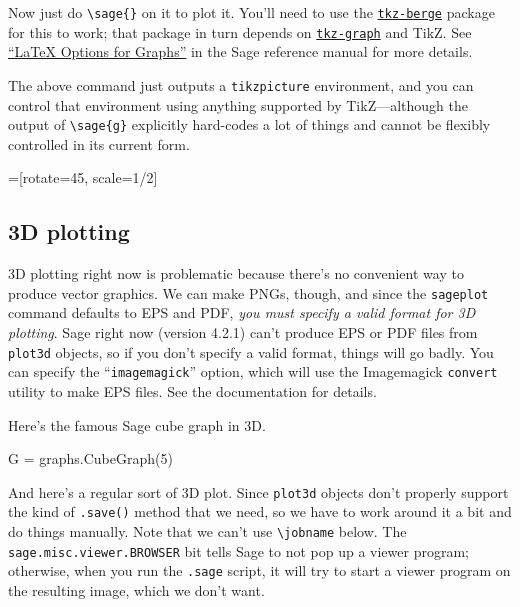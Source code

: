 \documentclass{article}
\begin{document}
Now just do \verb|\sage{}| on it to plot it. You'll need to use the
\href{http://altermundus.com/pages/graphtheory.html}{\texttt{tkz-berge}}
package for this to work; that package in turn depends on
\href{http://altermundus.com/pages/graph.html}{\texttt{tkz-graph}} and
TikZ. See
\href{http://sagemath.org/doc/reference/sage/graphs/graph_latex.html}{``\LaTeX{}
  Options for Graphs''} in the Sage reference manual for more details.

\begin{center}
\end{center}

The above command just outputs a \texttt{tikzpicture} environment, and
you can control that environment using anything supported by
TikZ---although the output of \verb|\sage{g}| explicitly hard-codes a
lot of things and cannot be flexibly controlled in its current form.

=[rotate=45, scale=1/2]

\begin{center}
\end{center}


\subsection{3D plotting}

3D plotting right now is problematic because there's no convenient way
to produce vector graphics. We can make PNGs, though, and since the
\verb|sageplot| command defaults to EPS and PDF, \emph{you must specify
  a valid format for 3D plotting}. Sage right now (version 4.2.1) can't
produce EPS or PDF files from \texttt{plot3d} objects, so if you don't
specify a valid format, things will go badly. You can specify the
``\texttt{imagemagick}'' option, which will use the Imagemagick
\texttt{convert} utility to make EPS files. See the documentation for
details.

Here's the famous Sage cube graph in 3D.

\begin{sageblock}
G = graphs.CubeGraph(5)
\end{sageblock}


And here's a regular sort of 3D plot. Since \texttt{plot3d} objects
don't properly support the kind of \texttt{.save()} method that we need,
so we have to work around it a bit and do things manually. Note that we
can't use \verb|\jobname| below. The \texttt{sage.misc.viewer.BROWSER}
bit tells Sage to not pop up a viewer program; otherwise, when you run
the \texttt{.sage} script, it will try to start a viewer program on the
resulting image, which we don't want.
\end{document}

